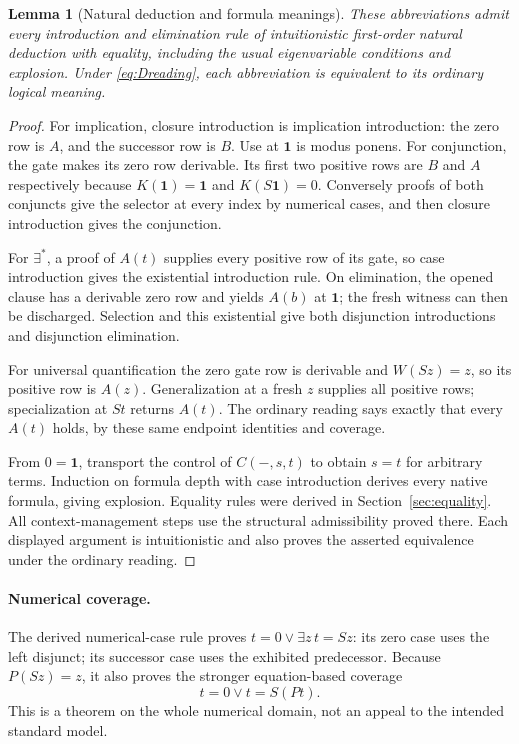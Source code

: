 \documentclass[11pt,letterpaper]{article}
\newtheorem{lemma}[theorem]{Lemma}
\theoremstyle{definition}\newtheorem{definition}[theorem]{Definition}
\theoremstyle{remark}\newtheorem{remark}[theorem]{Remark}
\newcommand{\one}{\mathbf1}
\begin{document}
\begin{lemma}[Natural deduction and formula meanings]\label{lem:logic}
These abbreviations admit every introduction and elimination rule of
intuitionistic first-order natural deduction with equality, including
the usual eigenvariable conditions and explosion. Under
\eqref{eq:Dreading}, each abbreviation is equivalent to its ordinary
logical meaning.
\end{lemma}
\begin{proof}
For implication, closure introduction is implication introduction:
the zero row is $A$, and the successor row is $B$. Use at $\one$
is modus ponens. For conjunction, the gate makes its zero row
derivable. Its first two positive rows are $B$ and $A$ respectively
because $K(\one)=\one$ and $K(S\one)=0$. Conversely proofs of
both conjuncts give the selector at every index by numerical cases,
and then closure introduction gives the conjunction.

For $\exists^*$, a proof of $A(t)$ supplies every positive row of
its gate, so case introduction gives the existential introduction
rule. On elimination, the opened clause has a derivable zero row
and yields $A(b)$ at $\one$; the fresh witness can then be
discharged. Selection and this existential give both disjunction
introductions and disjunction elimination.

For universal quantification the zero gate row is derivable and
$W(Sz)=z$, so its positive row is $A(z)$. Generalization at a
fresh $z$ supplies all positive rows; specialization at $St$
returns $A(t)$. The ordinary reading says exactly that every
$A(t)$ holds, by these same endpoint identities and coverage.

From $0=\one$, transport the control of $C(-,s,t)$ to obtain
$s=t$ for arbitrary terms. Induction on formula depth with case
introduction derives every native formula, giving explosion.
Equality rules were derived in Section~\ref{sec:equality}.
All context-management steps use the structural admissibility
proved there. Each displayed argument is intuitionistic and also
proves the asserted equivalence under the ordinary reading.
\end{proof}

\paragraph{Numerical coverage.}
The derived numerical-case rule proves
$t=0\lor\exists z\,t=Sz$: its zero case uses the left disjunct;
its successor case uses the exhibited predecessor. Because
$P(Sz)=z$, it also proves the stronger equation-based coverage
\begin{equation}\label{eq:coverage}
                  t=0\lor t=S(Pt).
\end{equation}
This is a theorem on the whole numerical domain, not an appeal
to the intended standard model.
\end{document}
